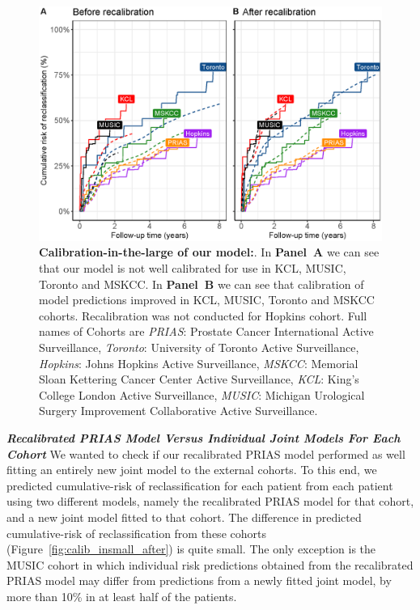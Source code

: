 \begin{figure}[!htb]
\centerline{\includegraphics[width=\columnwidth]{images/calib_before_after.eps}}
\caption{\textbf{Calibration-in-the-large of our model:}. In \textbf{Panel~A} we can see that our model is not well calibrated for use in KCL, MUSIC, Toronto and MSKCC. In \textbf{Panel~B} we can see that calibration of model predictions improved in KCL, MUSIC, Toronto and MSKCC cohorts. Recalibration was not conducted for Hopkins cohort. Full names of Cohorts are \textit{PRIAS}: Prostate Cancer International Active Surveillance, \textit{Toronto}: University of Toronto Active Surveillance, \textit{Hopkins}: Johns Hopkins Active Surveillance, \textit{MSKCC}: Memorial Sloan Kettering Cancer Center Active Surveillance, \textit{KCL}: King's College London Active Surveillance, \textit{MUSIC}: Michigan Urological Surgery Improvement Collaborative Active Surveillance.}
\label{fig:calib_before_after}
\end{figure}

\clearpage
\textbf{\textit{Recalibrated PRIAS Model Versus Individual Joint Models For Each Cohort}}
We wanted to check if our recalibrated PRIAS model performed as well fitting an entirely new joint model to the external cohorts. To this end, we predicted cumulative-risk of reclassification for each patient from each patient using two different models, namely the recalibrated PRIAS model for that cohort, and a new joint model fitted to that cohort. The difference in predicted cumulative-risk of reclassification from these cohorts (Figure~\ref{fig:calib_insmall_after}) is quite small. The only exception is the MUSIC cohort in which individual risk predictions obtained from the recalibrated PRIAS model may differ from predictions from a newly fitted joint model, by more than 10\% in at least half of the patients.
 
